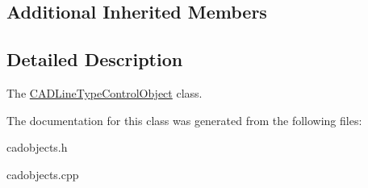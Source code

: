 \subsection*{Additional Inherited Members}


\subsection{Detailed Description}
The \hyperlink{class_c_a_d_line_type_control_object}{C\+A\+D\+Line\+Type\+Control\+Object} class. 

The documentation for this class was generated from the following files\+:\begin{DoxyCompactItemize}
\item 
cadobjects.\+h\item 
cadobjects.\+cpp\end{DoxyCompactItemize}
